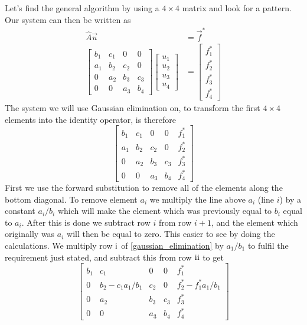 \documentclass[%
 reprint,
nofootinbib,
 amsmath,amssymb,
 aps,
]{revtex4-1}
\newcommand{\RN}[1]{%
  \textup{\uppercase\expandafter{\romannumeral#1}}%
}
\begin{document}
Let's find the general algorithm by using a $4\times4$ matrix and look for a pattern. Our system can then be written as
\begin{align*}
  \hat{A} \vec{u} &= \vec{f}^{*} \\
  \begin{bmatrix}
      b_1 & c_1 & 0   & 0   \\
      a_1 & b_2 & c_2 & 0   \\
      0   & a_2 & b_3 & c_3 \\
      0   & 0   & a_3 & b_4
  \end{bmatrix}
  \begin{bmatrix} u_1 \\ u_2 \\ u_3 \\ u_4 \end{bmatrix}
    &=
  \begin{bmatrix} f^{*}_1 \\ f^{*}_2 \\ f^{*}_3 \\ f^{*}_4 \end{bmatrix}
\end{align*}
The system we will use Gaussian elimination on, to transform the first $4\times 4$ elements into the identity operator, is therefore
\begin{equation}
  \begin{bmatrix}
      b_1 & c_1 & 0   & 0 &   f^{*}_1  \\
      a_1 & b_2 & c_2 & 0 &   f^{*}_2  \\
      0   & a_2 & b_3 & c_3 & f^{*}_3 \\
      0   & 0   & a_3 & b_4 & f^{*}_4
  \end{bmatrix} \label{gaussian_elimination}
\end{equation}
First we use the forward substitution to remove all of the elements along the bottom diagonal. To remove element $a_i$ we multiply the line above $a_i$ (line $i$) by a constant $a_i/b_i$ which will make the element which was previously equal to $b_i$ equal to $a_i$. After this is done we subtract row $i$ from row $i+1$, and the element which originally was $a_i$ will then be equal to zero. This easier to see by doing the calculations. We multiply row $\RN{1}$ of \eqref{gaussian_elimination} by $a_1/b_1$ to fulfil the requirement just stated, and subtract this from row $\RN{2}$ to get
\begin{equation}
  \begin{bmatrix}
      b_1 & c_1   & 0   & 0 &   f^{*}_1             \\
      0 & b_2-c_1a_1/b_1 & c_2 & 0 &   f^{*}_2- f^{*}_1a_1/b_1  \\
      0   & a_2 & b_3 & c_3 & f^{*}_3 \\
      0   & 0   & a_3 & b_4 & f^{*}_4
  \end{bmatrix} \label{gaussian_elimination2}
\end{equation}
\end{document}
